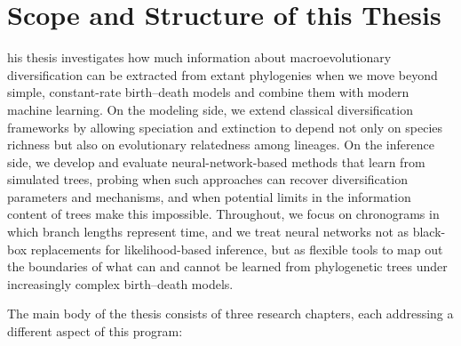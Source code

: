 \clearpage
\section{Scope and Structure of this Thesis}
his thesis investigates how much information about macroevolutionary diversification can be extracted from extant phylogenies when we move beyond simple, constant-rate birth--death models and combine them with modern machine learning. On the modeling side, we extend classical diversification frameworks by allowing speciation and extinction to depend not only on species richness but also on evolutionary relatedness among lineages. On the inference side, we develop and evaluate neural-network-based methods that learn from simulated trees, probing when such approaches can recover diversification parameters and mechanisms, and when potential limits in the information content of trees make this impossible. Throughout, we focus on chronograms in which branch lengths represent time, and we treat neural networks not as black-box replacements for likelihood-based inference, but as flexible tools to map out the boundaries of what can and cannot be learned from phylogenetic trees under increasingly complex birth--death models.

The main body of the thesis consists of three research chapters, each addressing a different aspect of this program:

